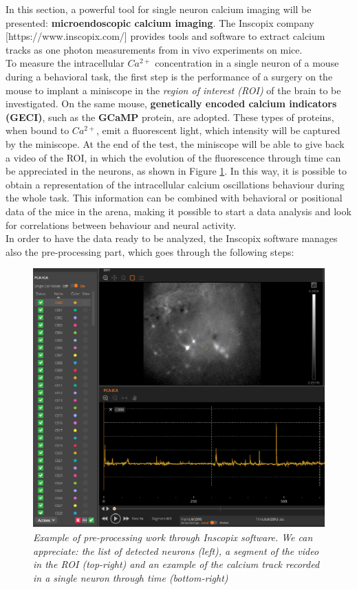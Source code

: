 \documentclass[12pt, a4paper]{article}
\begin{document}
In this section, a powerful tool for single neuron calcium imaging will be presented: \textbf{microendoscopic calcium imaging}. The Inscopix company [https://www.inscopix.com/] provides tools and software to extract calcium tracks as one photon measurements from in vivo experiments on mice.\\
To measure the intracellular $Ca^{2+}$ concentration in a single neuron of a mouse during a behavioral task, the first step is the performance of a surgery on the mouse to implant a miniscope in the \textit{region of interest (ROI)} of the brain to be investigated. On the same mouse, \textbf{genetically encoded calcium indicators (GECI)}, such as the \textbf{GCaMP} protein, are adopted. These types of proteins, when bound to $Ca^{2+}$, emit a fluorescent light, which intensity will be captured by the miniscope. At the end of the test, the miniscope will be able to give back a video of the ROI, in which the evolution of the fluorescence through time can be appreciated  in the neurons, as shown in Figure \ref{inscopix}. In this way, it is possible to obtain a representation of the intracellular calcium oscillations behaviour during the whole task. This information can be combined with behavioral or positional data of the mice in the arena, making it possible to start a data analysis and look for correlations between behaviour and neural activity.\\
In order to have the data ready to be analyzed, the Inscopix software manages also the pre-processing part, which goes through the following steps:

\begin{figure}[H]
	\begin{center}
		\includegraphics[scale=.70]{Inscopix2.png} 
	\end{center} 
	\caption{\textit{Example of pre-processing work through Inscopix software. We can appreciate: the list of detected neurons (left), a segment of the video in the ROI (top-right) and an example of the calcium track recorded in a single neuron through time (bottom-right)}}
	\label{inscopix}
\end{figure}
\end{document}
